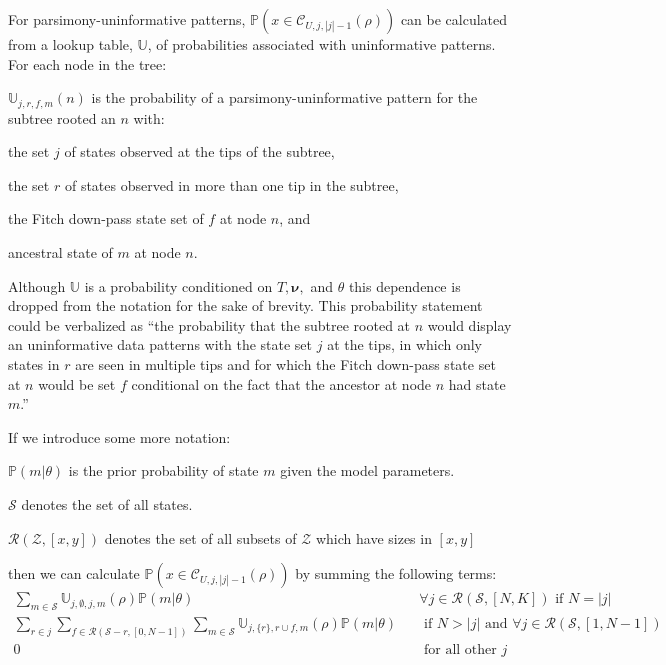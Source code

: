 \documentclass[11pt]{article}
\newcommand{\treeRoot}{\ensuremath{\rho}\xspace}
\newcommand{\uninform}{\ensuremath{U}\xspace}
\newcommand{\numStates}{\ensuremath{K}\xspace}
\newcommand{\numLeavesTotal}{\ensuremath{N}\xspace}
\newcommand{\allStates}{\ensuremath{\mathcal S}\xspace}
\newcommand{\edgeLengths}{\ensuremath{\bm \nu}\xspace}
\newcommand{\patProbSym}{\ensuremath{\mathbb P}\xspace}
\renewcommand{\Pr}{\patProbSym}
\newcommand{\patClassSym}{\ensuremath{\mathcal C}\xspace}
\newcommand{\patClass}[3]{\ensuremath{\patClassSym_{#1,#2,#3}}\xspace}
\newcommand{\probUninformPatClassSym}{\ensuremath{\mathbb U}\xspace}
\newcommand{\probUninformPatClass}[5]{\ensuremath{\probUninformPatClassSym_{#1,#2,#3,#4}\left(#5\right)}\xspace}
\newcommand{\subsetsOfSizeSet}[3]{\ensuremath{\mathcal R}\left(#1,\left[#2,#3\right]\right)\xspace}
\begin{document}
For parsimony-uninformative patterns, $\Pr(x\in\patClass{\uninform}{j}{|j|-1}(\treeRoot))$ can be calculated from a lookup table, $\probUninformPatClassSym$, of probabilities associated with uninformative patterns.
For each node in the tree:
\begin{compactitem}
	\item $\probUninformPatClass{j}{r}{f}{m}{n}$ is the probability of a parsimony-uninformative pattern for the subtree rooted an $n$ with:
		\begin{compactitem}
			\item the set $j$ of states observed at the tips of the subtree,
			\item the set $r$ of states observed in more than one tip in the subtree,
			\item the Fitch down-pass state set of $f$ at node $n$, and
			\item ancestral state of $m$ at node $n$.
		\end{compactitem}
		Although \probUninformPatClassSym is a probability conditioned on $T, \edgeLengths,$ and $\theta$ this dependence is dropped from the notation for the sake of brevity.
		This probability statement could be verbalized as ``the probability that the subtree rooted at $n$ would display an uninformative data patterns with the state set $j$ at the tips, in which only states in $r$ are seen in multiple tips and for which the Fitch down-pass state set at $n$ would be set $f$ conditional on the fact that the ancestor at node $n$ had state $m$.''
\end{compactitem}
If we introduce some more notation:
\begin{compactitem}
	\item $\Pr(m|\theta)$ is the prior probability of state $m$ given the model parameters.
	\item \allStates denotes the set of all states.
	\item $\subsetsOfSizeSet{\mathcal{Z}}{x}{y}$ denotes the set of all subsets of ${\mathcal Z}$ which have sizes in $[x,y]$
\end{compactitem}
then we can calculate $\Pr(x\in\patClass{\uninform}{j}{|j|-1}(\treeRoot))$ by summing the following terms:
\begin{eqnarray}
   \sum_{m\in\allStates}\probUninformPatClass{j}{\emptyset}{j}{m}{\treeRoot}\Pr(m|\theta) && 	\forall j \in  \subsetsOfSizeSet{\allStates}{\numLeavesTotal}{\numStates} \mbox{ if } N = |j|  \label{noRepeatedStates}\\
  \sum_{r\in j}\sum_{f\in\subsetsOfSizeSet{\allStates-r}{0}{\numLeavesTotal-1}}\sum_{m\in\allStates}\probUninformPatClass{j}{\{r\}}{r\cup f}{m}{\treeRoot}\Pr(m|\theta)  &&  \mbox{ if } N > |j| \mbox{ and }\forall j \in  \subsetsOfSizeSet{\allStates}{1}{\numLeavesTotal-1}\label{oneRepeatedState}\\
  0 && \mbox{ for all other } j \mbox{}
\end{eqnarray}
\end{document}
